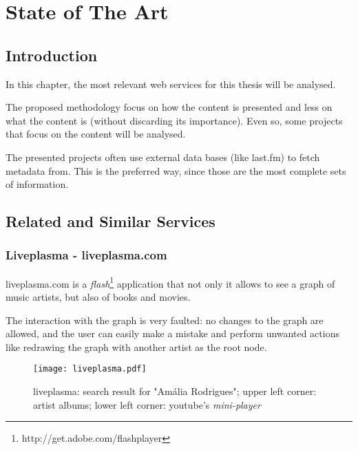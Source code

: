 
\chapter{State of The Art} \label{chap:chap2}

\section*{}

\section{Introduction}

In this chapter, the most relevant web services for this thesis will be analysed.

The proposed methodology focus on how the content is presented and less on what the content is (without discarding its importance).
Even so, some projects that focus on the content will be analysed.

The presented projects often use external data bases (like last.fm) to fetch metadata from.
This is the preferred way, since those are the most complete sets of information. 

\section{Related and Similar Services} %
\label{sec:related_similar_services}

\subsection{Liveplasma - liveplasma.com} %
\label{sub:liveplasma}

liveplasma.com is a \emph{flash}\footnote{http://get.adobe.com/flashplayer} application that not only it allows to see a graph of music artists, but also of books and movies.

The interaction with the graph is very faulted: no changes to the graph are allowed, and the user can easily make a mistake and perform unwanted actions like redrawing the graph with another artist as the root node.

\begin{figure}
  \begin{center}
    \texttt{[image: liveplasma.pdf]}
  \end{center}
  \caption{liveplasma: search result for "Amália Rodrigues"; upper left corner: artist albums; lower left corner: youtube's \emph{mini-player}}
  \label{fig:sota_liveplasma}
\end{figure}

